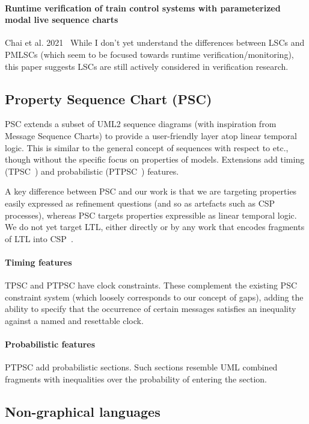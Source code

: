 \paragraph{Runtime verification of train control systems with parameterized modal live sequence charts}
Chai et al. 2021~\cite{Chai21-PMLSC}
While I don't yet understand the differences between LSCs and PMLSCs (which
seem to be focused towards runtime verification/monitoring), this paper
suggests LSCs are still actively considered in verification research.

\subsection{Property Sequence Chart (PSC)}

PSC extends a subset of UML2 sequence diagrams (with inspiration from
Message Sequence Charts) to provide a
user-friendly layer atop linear temporal logic.  This is
similar to the general concept of \langname{} sequences with respect to \tockcsp{}
etc., though without the
specific focus on properties of \robochart{} models.
Extensions add timing (TPSC~\cite{tpsc}) and
probabilistic (PTPSC~\cite{ptpsc}) features.

A key difference between PSC and our work is that we are
targeting  properties easily expressed as refinement questions
(and so as artefacts such as CSP processes), whereas PSC targets properties
expressible as linear temporal logic.  We do not yet target LTL,
either directly or by any work that encodes fragments of LTL into
CSP~\cite{fdrspin,Lowe08-CommunicatingProcessSpecification}.

\paragraph{Timing features}
TPSC and PTPSC have clock constraints.  These complement the existing PSC constraint system
(which loosely corresponds to our concept of gaps), adding the ability to
specify that the occurrence of certain messages satisfies an inequality against
a named and resettable clock.

\paragraph{Probabilistic features}
PTPSC add probabilistic
sections.  Such sections resemble UML combined fragments with inequalities over
the probability of entering the section.

\subsection{Non-graphical languages}

